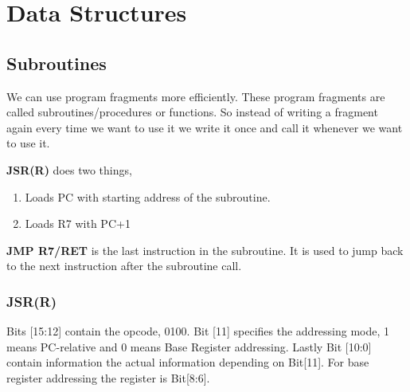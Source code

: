 \chapter{Data Structures}
\section{Subroutines}
We can use program fragments more efficiently. These program fragments are called subroutines/procedures or functions. So instead of writing a fragment again every time we want to use it we write it once and call it whenever we want to use it.


\textbf{JSR(R)} does two things, 

\begin{enumerate}
    \item Loads PC with starting address of the subroutine.
    \item Loads R7 with PC+1
\end{enumerate}

\textbf{JMP R7/RET} is the last instruction in the subroutine. It is used to jump back to the next instruction after the subroutine call.

\subsection{JSR(R)}
Bits [15:12] contain the opcode, 0100. Bit [11] specifies the addressing mode, 1 means PC-relative and $0$ means Base Register addressing. Lastly Bit [10:0] contain information the actual information depending on Bit[11]. For base register addressing the register is Bit[8:6].








